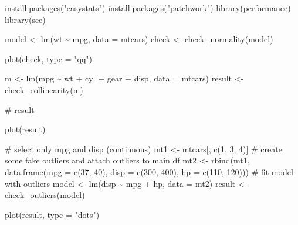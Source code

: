 \documentclass[
]{article}
\newenvironment{Shaded}{\begin{snugshade}}{\end{snugshade}}
\newcommand{\AttributeTok}[1]{\textcolor[rgb]{0.40,0.45,0.13}{#1}}
\newcommand{\CommentTok}[1]{\textcolor[rgb]{0.37,0.37,0.37}{#1}}
\newcommand{\DecValTok}[1]{\textcolor[rgb]{0.68,0.00,0.00}{#1}}
\newcommand{\FunctionTok}[1]{\textcolor[rgb]{0.28,0.35,0.67}{#1}}
\newcommand{\NormalTok}[1]{\textcolor[rgb]{0.00,0.23,0.31}{#1}}
\newcommand{\OtherTok}[1]{\textcolor[rgb]{0.00,0.23,0.31}{#1}}
\newcommand{\SpecialCharTok}[1]{\textcolor[rgb]{0.37,0.37,0.37}{#1}}
\newcommand{\StringTok}[1]{\textcolor[rgb]{0.13,0.47,0.30}{#1}}
\begin{document}
\begin{Shaded}
\begin{Highlighting}[]
\FunctionTok{install.packages}\NormalTok{(}\StringTok{"easystats"}\NormalTok{)}
\FunctionTok{install.packages}\NormalTok{(}\StringTok{"patchwork"}\NormalTok{)}
\FunctionTok{library}\NormalTok{(performance)}
\FunctionTok{library}\NormalTok{(see)}

\NormalTok{model }\OtherTok{\textless{}{-}} \FunctionTok{lm}\NormalTok{(wt }\SpecialCharTok{\textasciitilde{}}\NormalTok{ mpg, }\AttributeTok{data =}\NormalTok{ mtcars)}
\NormalTok{check }\OtherTok{\textless{}{-}} \FunctionTok{check\_normality}\NormalTok{(model)}

\FunctionTok{plot}\NormalTok{(check, }\AttributeTok{type =} \StringTok{"qq"}\NormalTok{)}

\NormalTok{m }\OtherTok{\textless{}{-}} \FunctionTok{lm}\NormalTok{(mpg }\SpecialCharTok{\textasciitilde{}}\NormalTok{ wt }\SpecialCharTok{+}\NormalTok{ cyl }\SpecialCharTok{+}\NormalTok{ gear }\SpecialCharTok{+}\NormalTok{ disp, }\AttributeTok{data =}\NormalTok{ mtcars)}
\NormalTok{result }\OtherTok{\textless{}{-}} \FunctionTok{check\_collinearity}\NormalTok{(m)}

\CommentTok{\# result}

\FunctionTok{plot}\NormalTok{(result)}


\CommentTok{\# select only mpg and disp (continuous)}
\NormalTok{mt1 }\OtherTok{\textless{}{-}}\NormalTok{ mtcars[, }\FunctionTok{c}\NormalTok{(}\DecValTok{1}\NormalTok{, }\DecValTok{3}\NormalTok{, }\DecValTok{4}\NormalTok{)]}
\CommentTok{\# create some fake outliers and attach outliers to main df}
\NormalTok{mt2 }\OtherTok{\textless{}{-}} \FunctionTok{rbind}\NormalTok{(mt1, }\FunctionTok{data.frame}\NormalTok{(}\AttributeTok{mpg =} \FunctionTok{c}\NormalTok{(}\DecValTok{37}\NormalTok{, }\DecValTok{40}\NormalTok{), }\AttributeTok{disp =} \FunctionTok{c}\NormalTok{(}\DecValTok{300}\NormalTok{, }\DecValTok{400}\NormalTok{), }\AttributeTok{hp =} \FunctionTok{c}\NormalTok{(}\DecValTok{110}\NormalTok{, }\DecValTok{120}\NormalTok{)))}
\CommentTok{\# fit model with outliers}
\NormalTok{model }\OtherTok{\textless{}{-}} \FunctionTok{lm}\NormalTok{(disp }\SpecialCharTok{\textasciitilde{}}\NormalTok{ mpg }\SpecialCharTok{+}\NormalTok{ hp, }\AttributeTok{data =}\NormalTok{ mt2)}
\NormalTok{result }\OtherTok{\textless{}{-}} \FunctionTok{check\_outliers}\NormalTok{(model)}

\FunctionTok{plot}\NormalTok{(result, }\AttributeTok{type =} \StringTok{"dots"}\NormalTok{)}


\end{Highlighting}
\end{Shaded}
\end{document}

